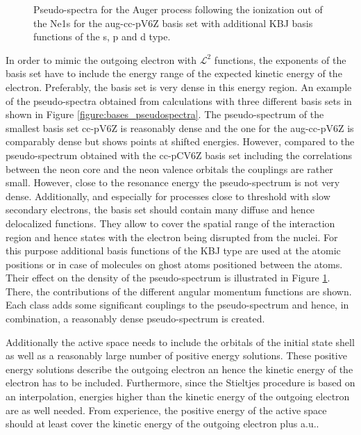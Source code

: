 \begin{figure}[ht]
  \centering
  
  \caption{Pseudo-spectra for the Auger process following the ionization
           out of the Ne1s for the aug-cc-pV6Z basis set with additional
           \ac{KBJ} basis functions of the s, p and d type.}
  \label{figure:bases_jungen}
\end{figure}

In order to mimic the outgoing electron with $\mathcal{L}^2$ functions, the
exponents of the basis set have to include the energy range of the expected
kinetic energy of the electron. Preferably, the basis set is very dense in
this energy region. 
An example of the pseudo-spectra obtained from calculations with three
different basis sets in shown in Figure \ref{figure:bases_pseudospectra}.
The pseudo-spectrum of the smallest basis set cc-pV6Z is reasonably dense and
the one for the aug-cc-pV6Z is comparably dense but shows points at shifted
energies. However, compared to the pseudo-spectrum obtained with the cc-pCV6Z
basis set including the correlations between the neon core and the neon valence
orbitals the couplings are rather small. However, close to the resonance energy
the pseudo-spectrum is not very dense.
Additionally, and especially for processes close to threshold     
with slow                                                               
secondary electrons, the basis set should contain many diffuse and hence
delocalized functions.
They allow to cover the spatial range of the interaction
region and hence states with the electron being disrupted from the nuclei.
For this purpose additional basis functions of the \ac{KBJ}\cite{Kaufmann89}
type are used at the atomic positions or in case of molecules on ghost atoms
positioned between the atoms. Their effect on the density of the pseudo-spectrum
is illustrated in Figure \ref{figure:bases_jungen}. There, the contributions of the
different angular momentum functions are shown. Each class adds some significant
couplings to the pseudo-spectrum and hence, in combination, a reasonably dense
pseudo-spectrum is created.

Additionally the active space needs to include the orbitals of the initial state
shell as well as a reasonably large number of positive energy solutions. These
positive energy solutions describe the outgoing electron an hence the kinetic energy
of the electron has to be included. Furthermore, since the Stieltjes procedure is
based on an interpolation, energies higher than the kinetic energy of the outgoing
electron are as well needed. From experience, the positive energy of the active
space should at least cover the kinetic energy of the outgoing electron plus
\unit[10]{a.u.}.



